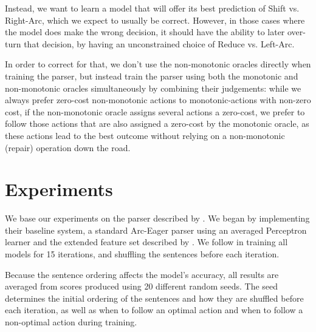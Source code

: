 \documentclass[11pt,letterpaper]{article}
\begin{document}
Instead,  we want to learn a model that will offer its best prediction of Shift vs.
Right-Arc, which we expect to usually be correct.  However, in those cases
where the model does make the wrong decision, it should have the ability to
later over-turn that decision, by having an unconstrained
choice of Reduce vs. Left-Arc.

In order to correct for that, we don't use the non-monotonic oracles directly
when training the parser, but instead train the parser using both the
monotonic and non-monotonic oracles simultaneously by combining their
judgements: while we always prefer zero-cost non-monotonic actions to
monotonic-actions with non-zero cost, if the non-monotonic oracle assigns
several actions a zero-cost,
we prefer to follow those actions that are also assigned a zero-cost by the
monotonic oracle, as these actions lead to the best outcome without
relying on a non-monotonic (repair) operation down the road.


\section{Experiments}

We base our experiments on the parser described by \citet{goldberg:12}. We
began by implementing their baseline system, a standard Arc-Eager parser using
an averaged Perceptron learner and the extended feature set described by \citet{zhang:11}.
We follow \citet{goldberg:12} in training all models for 15 iterations,
and shuffling the sentences before each iteration.


Because the sentence ordering affects the model's accuracy,
all results are averaged from scores produced using 20 
different random seeds. The seed determines the initial ordering of the
sentences and how they are shuffled before each iteration, as well as when to
follow an optimal action and when to follow a non-optimal action during training.

\end{document}
